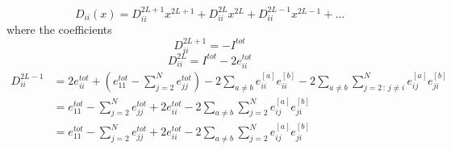 \documentclass[11pt]{article}
\numberwithin{equation}{subsection}
\begin{document}
\begin{equation}
	D_{ii}(x)=D_{ii}^{2L+1}x^{2L+1}+D_{ii}^{2L}x^{2L}+D_{ii}^{2L-1}x^{2L-1}+\ldots
\end{equation}
where the coefficients
\begin{equation}\label{a2lp}
	D_{ii}^{2L+1}=-I^{tot}
\end{equation}\begin{equation}\label{a2l}
	D_{ii}^{2L}=I^{tot}-2e_{ii}^{tot}
\end{equation}
\begin{equation}\label{a2lm1}
	\begin{split}
		D_{ii}^{2L-1}&=2e_{ii}^{tot}+\left(e_{11}^{tot}-\sum_{j=2}^{N}e_{jj}^{tot}\right)-2\sum_{a\neq b}e_{ii}^{[a]}e_{ii}^{[b]}-2\sum_{a\neq b}\sum_{j=2\,:\,j\neq i}^{N}e_{ij}^{[a]}e_{ji}^{[b]}\\
		&=e_{11}^{tot}-\sum_{j=2}^{N}e_{jj}^{tot}+2e_{ii}^{tot}-2\sum_{a\neq b}\sum_{j=2}^{N}e_{ij}^{[a]}e_{ji}^{[b]}\\
		&=e_{11}^{tot}-\sum_{j=2}^{N}e_{jj}^{tot}+2e_{ii}^{tot}-2\sum_{a\neq b}\sum_{j=2}^{N}e_{ij}^{[a]}e_{ji}^{[b]}\\ 
	\end{split}
\end{equation}
\end{document}
